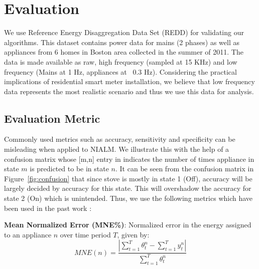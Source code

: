 \documentclass[conference]{IEEEtran}
\newcommand{\figref}[1]{Figure~\ref{#1}}
\begin{document}
\section{Evaluation}

We use Reference Energy Disaggregation Data Set (REDD) \cite{redd} for validating our algorithms. This dataset contains power data for mains (2 phases) as well as appliances from 6 homes in Boston area collected in the summer of 2011. The data is made available as raw, high frequency (sampled at 15 KHz) and low frequency (Mains at 1 Hz, appliances at ~0.3 Hz). Considering the practical implications of residential smart meter installation, we believe that low frequency data represents the most realistic scenario and thus we use this data for analysis. 



%	
%
\subsection{Evaluation Metric}

\noindent Commonly used metrics such as accuracy, sensitivity and specificity can be misleading when applied to NIALM. We illustrate this with the help of a confusion matrix whose [m,n] entry in indicates the number of times appliance in state $m$ is predicted to be in state $n$. It can be seen from the confusion matrix in \figref{fig:confusion} that since stove is mostly in state 1 (Off), accuracy will be largely decided by accuracy for this state. This will overshadow the accuracy for state 2 (On) which is unintended.
Thus, we use the following metrics which have been used in the past work \cite{parson2012_aaai,redd}:

\noindent\textbf{Mean Normalized Error (MNE\%)}: Normalized error in the energy assigned to an appliance $n$ over time period $T$, given by:
\begin{equation}
MNE(n)=\frac{|\sum\limits_{t=1}^{T}\theta_t^n-\sum\limits_{t=1}^{T}y_t^n|}{\sum\limits_{t=1}^{T}\theta_t^n} 
\end{equation} 
\end{document}
